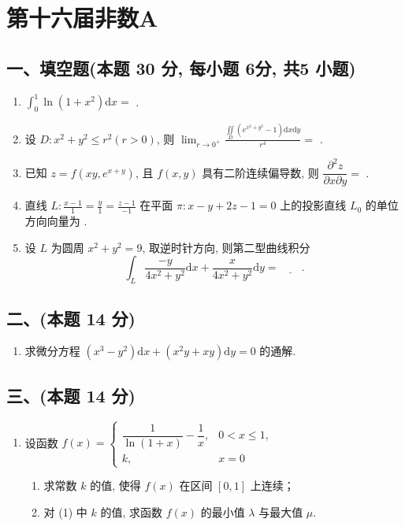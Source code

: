 \newpage
\section{第十六届非数A}

\subsection*{一、填空题(本题 30 分,  每小题 6分,  共5 小题)}
\begin{enumerate}
    \item $\displaystyle\int_{0}^{1} \ln(1 + x^2) \mathrm{d}x =$\underline{\quad\quad} .
    \item 设 $D: x^2 + y^2 \leqslant r^2 (r > 0)$, 则 $\displaystyle\lim_{r \to 0^+} \frac{\displaystyle\iint\limits_{D} (e^{x^2 + y^2} - 1) \mathrm{d}x \mathrm{d}y}{r^4} =$\underline{\quad\quad} .
    \item 已知 $z = f(xy, e^{x+y})$, 且 $f(x, y)$ 具有二阶连续偏导数, 则 $\dfrac{\partial^2 z}{\partial x \partial y} = $\underline{\quad\quad} .
    \item 直线 $L: \frac{x-1}{1} = \frac{y}{1} = \frac{z-1}{-1}$ 在平面 $\pi: x - y + 2z - 1 = 0$ 上的投影直线 $L_0$ 的单位方向向量为\underline{\quad\quad} .
    \item 设 $L$ 为圆周 $x^2 + y^2 = 9$, 取逆时针方向, 则第二型曲线积分
          \[
              \int_{L} \frac{-y}{4x^2 + y^2} \mathrm{d}x + \frac{x}{4x^2 + y^2} \mathrm{d}y =\underline{\quad\quad} .
          \]
\end{enumerate}

\subsection*{二、(本题 14 分)}
\begin{enumerate}[start=6]
    \item 求微分方程 $(x^3 - y^2) \mathrm{d}x + (x^2 y + xy) \mathrm{d}y = 0$ 的通解.
\end{enumerate}

\subsection*{三、(本题 14 分)}
\begin{enumerate}[start=7]
    \item 设函数
          $f(x) = \begin{cases}
                  \dfrac{1}{\ln(1 + x)} - \dfrac{1}{x}, & 0 < x \leq 1, \\[8pt]
                  k,                                    & x = 0
              \end{cases}$
          \begin{enumerate}
              \item[(1)] 求常数 $k$ 的值, 使得 $f(x)$ 在区间 $[0, 1]$ 上连续；
              \item[(2)]  对 (1) 中 $k$ 的值, 求函数 $f(x)$ 的最小值 $\lambda$ 与最大值 $\mu$.
          \end{enumerate}
\end{enumerate}

